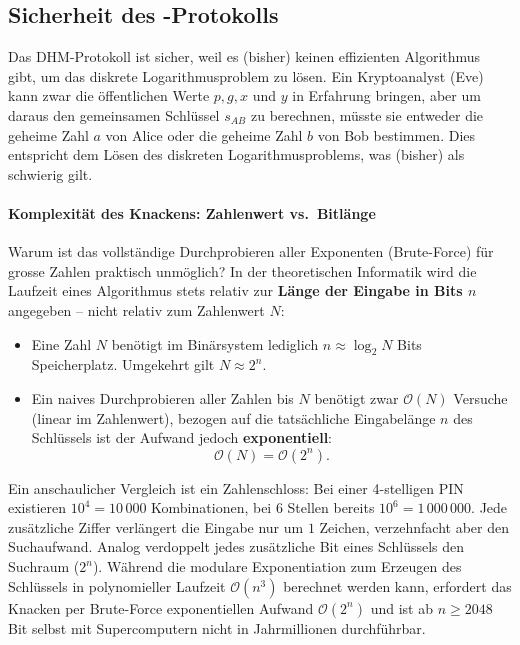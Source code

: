 \subsection{Sicherheit des \texorpdfstring{}{DHM}-Protokolls}
Das \gls{DHM}-Protokoll ist sicher, weil es (bisher) keinen effizienten Algorithmus gibt, um das diskrete Logarithmusproblem zu lösen. Ein Kryptoanalyst (Eve) kann zwar die öffentlichen Werte $p, g, x$ und $y$ in Erfahrung bringen, aber um daraus den gemeinsamen Schlüssel $s_{AB}$ zu berechnen, müsste sie entweder die geheime Zahl $a$ von Alice oder die geheime Zahl $b$ von Bob bestimmen. Dies entspricht dem Lösen des diskreten Logarithmusproblems, was (bisher) als schwierig gilt.

\paragraph*{Komplexität des Knackens: Zahlenwert vs.\ Bitlänge}
Warum ist das vollständige Durchprobieren aller Exponenten (Brute-Force) für grosse Zahlen praktisch unmöglich? In der theoretischen Informatik wird die Laufzeit eines Algorithmus stets relativ zur \textbf{Länge der Eingabe in Bits $n$} angegeben -- nicht relativ zum Zahlenwert $N$:
\begin{itemize}
	\item Eine Zahl $N$ benötigt im Binärsystem lediglich $n \approx \log_2 N$ Bits Speicherplatz. Umgekehrt gilt $N \approx 2^n$.
	\item Ein naives Durchprobieren aller Zahlen bis $N$ benötigt zwar $\mathcal{O}(N)$ Versuche (linear im Zahlenwert), bezogen auf die tatsächliche Eingabelänge $n$ des Schlüssels ist der Aufwand jedoch \textbf{exponentiell}:
	      \[
		      \mathcal{O}(N) = \mathcal{O}(2^n).
	      \]
\end{itemize}
Ein anschaulicher Vergleich ist ein Zahlenschloss: Bei einer 4-stelligen \gls{PIN} existieren $10^4 = 10\,000$ Kombinationen, bei 6 Stellen bereits $10^6 = 1\,000\,000$. Jede zusätzliche Ziffer verlängert die Eingabe nur um $1$ Zeichen, verzehnfacht aber den Suchaufwand. Analog verdoppelt jedes zusätzliche Bit eines Schlüssels den Suchraum ($2^n$). Während die modulare Exponentiation zum Erzeugen des Schlüssels in polynomieller Laufzeit $\mathcal{O}(n^3)$ berechnet werden kann, erfordert das Knacken per Brute-Force exponentiellen Aufwand $\mathcal{O}(2^n)$ und ist ab $n \ge 2048$ Bit selbst mit Supercomputern nicht in Jahrmillionen durchführbar.

